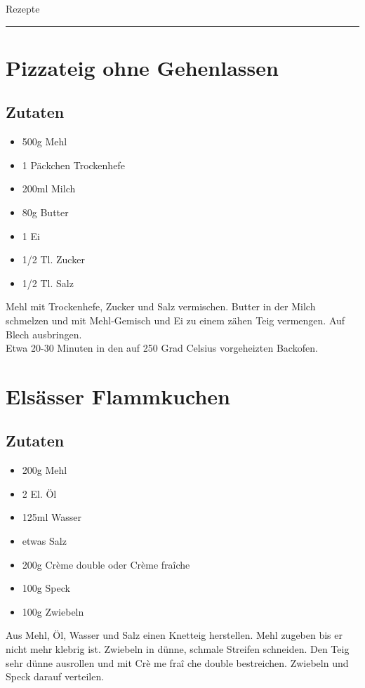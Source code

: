 \documentclass{article}
\begin{document}
{\Huge Rezepte}
\vspace{1cm}
\hrule
\vspace{1cm}
\tableofcontents
\newpage

\section{Pizzateig ohne Gehenlassen}
	\subsection*{Zutaten}
	\begin{itemize}
	  \item 500g Mehl
	  \item 1 Päckchen Trockenhefe
	  \item 200ml Milch
	  \item 80g Butter
	  \item 1 Ei
	  \item 1/2 Tl. Zucker
	  \item 1/2 Tl. Salz
	\end{itemize}
	Mehl mit Trockenhefe, Zucker und Salz vermischen.
	Butter in der Milch schmelzen und mit Mehl-Gemisch und Ei zu einem zähen Teig
	vermengen. Auf Blech ausbringen.\\
	Etwa 20-30 Minuten in den auf 250 Grad Celsius vorgeheizten Backofen.
	
\section{Elsässer Flammkuchen}
	\subsection*{Zutaten}
	\begin{itemize}
	  \item 200g Mehl
	  \item 2 El. Öl
	  \item 125ml Wasser
	  \item etwas Salz
	  \item 200g Cr\`{e}me double oder Cr\`{e}me fra\^{i}che
	  \item 100g Speck
	  \item 100g Zwiebeln
	\end{itemize}
	Aus Mehl, Öl, Wasser und Salz einen Knetteig herstellen.
	Mehl zugeben bis er nicht mehr klebrig ist.
	Zwiebeln in dünne, schmale Streifen schneiden.
	Den Teig sehr dünne ausrollen und mit Cr\`{e} me fra\^{i} che double
	bestreichen.
	Zwiebeln und Speck darauf verteilen.
	
\end{document}
